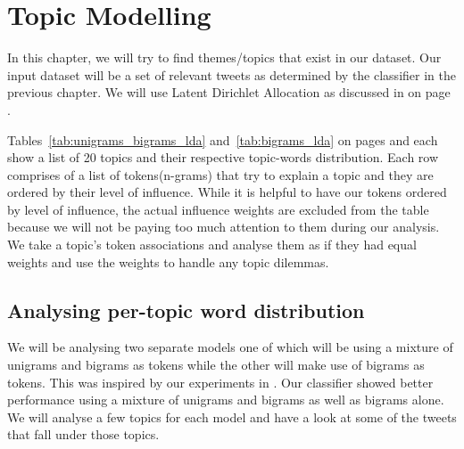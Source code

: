 \chapter{Topic Modelling}
\label{cha:topic_modelling}
In this chapter, we will try to find themes/topics that exist in our dataset. Our input dataset will
be a set of relevant tweets as determined by the classifier in the previous chapter. We will use
Latent Dirichlet Allocation as discussed in  on page \pageref{sec:bg_lda}.

Tables~\ref{tab:unigrams_bigrams_lda} and~\ref{tab:bigrams_lda} on pages
\pageref{tab:unigrams_bigrams_lda} and \pageref{tab:bigrams_lda} each show a list of 20 topics and
their respective topic-words distribution. Each row comprises of a list of tokens(n-grams) that try
to explain a topic and they are ordered by their level of influence. While it is helpful to have our
tokens ordered by level of influence, the actual influence weights are excluded from the table
because we will not be paying too much attention to them during our analysis. We take a topic's
token associations and analyse them as if they had equal weights and use the weights to handle any
topic dilemmas.

\section{Analysing per-topic word distribution}
\label{sec:analysing_topic_word_distribution}
We will be analysing two separate models one of which will be using a mixture of unigrams and
bigrams as tokens while the other will make use of bigrams as tokens. This was inspired by our
experiments in . Our classifier showed better performance using
a mixture of unigrams and bigrams as well as bigrams alone. We will analyse a few topics for each
model and have a look at some of the tweets that fall under those topics.

